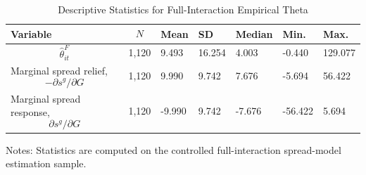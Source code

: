 \begin{table}[H]\centering
\begin{threeparttable}
\caption{Descriptive Statistics for Full-Interaction Empirical Theta}
\label{tab:theta_descriptive_stats}
\scriptsize
\begin{tabularx}{\textwidth}{lYYYYYY}
\toprule
Variable & $$N$$ & Mean & SD & Median & Min. & Max. \\
\midrule
$$\widehat{\theta}^{F}_{it}$$ & 1,120 & 9.493 & 16.254 & 4.003 & -0.440 & 129.077 \\
Marginal spread relief, $$-\partial s^g/\partial G$$ & 1,120 & 9.990 & 9.742 & 7.676 & -5.694 & 56.422 \\
Marginal spread response, $$\partial s^g/\partial G$$ & 1,120 & -9.990 & 9.742 & -7.676 & -56.422 & 5.694 \\
\bottomrule
\end{tabularx}
\begin{tablenotes}[flushleft]\footnotesize
\item Notes: Statistics are computed on the controlled full-interaction spread-model estimation sample.
\end{tablenotes}
\end{threeparttable}
\end{table}
